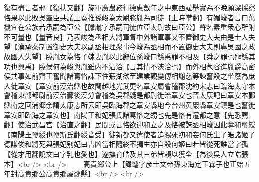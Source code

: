 復有盡言者邪【復扶又翻】旋軍廣農務行德惠數年之中東西竝舉實為不晩願深採察恪果以此敗吳羣臣共議上奏推孫峻為太尉滕胤為司徒【上時掌翻】有媚峻者言曰萬機宜在公族若承嗣為亞公【滕胤字承嗣司徒位亞太尉故曰亞公】聲名素重衆心所附不可量也【量音良】乃表峻為丞相大將軍督中外諸軍事又不置御史大夫由是士人失望【漢承秦制置御史大夫以副丞相理衆事今峻為丞相而不置御史大夫則專吳國之政故國人失望】滕胤女為恪子竦妻胤以此辭位孫峻曰鯀禹罪不相及【舜之罪也殛鯀其功也興禹】滕侯何為峻與胤雖内不沾洽【言其情不浹洽也】而外相苞容進胤爵高密侯共事如前齊王奮聞諸葛恪誅下住蕪湖欲至建業觀變傳相謝慈等諫奮殺之坐廢為庶人徙章安【章安前漢治縣也故閩越地光武更名章安屬會稽郡沈約宋志曰臨海太守本會稽東部都尉前漢治鄞後漢分會稽為吳郡疑是都尉徙治章安也晉太康記曰章安本鄞縣南之回浦郷余謂太康志所云即吳臨海郡之章安縣地今台州黄巖縣章安鎮是也奮徙章安即臨海之章安也】南陽王和妃張氏諸葛恪之甥也先是恪有遷都之意【先悉薦翻】使治武昌宫【治直之翻】民間或言恪欲迎和立之及恪被誅丞相峻因此奪和璽綬【南陽王璽綬也璽斯氏翻綬音受】徙新都又遣使者追賜死初和妾何氏生子皓諸姬子德謙俊和將死與張妃别妃曰吉凶當相隨終不獨生亦自殺何姬曰若皆從死誰當字孤【從才用翻說文曰字乳也愛也】遂撫育皓及其三弟皆賴以獲全【為後吳人立皓張本】<br />
<br />
　　高貴鄉公上【諱髦字彦士文帝孫東海定王霖子也正始五年封高貴鄉公高貴鄉屬郯縣】<br />
<br />
